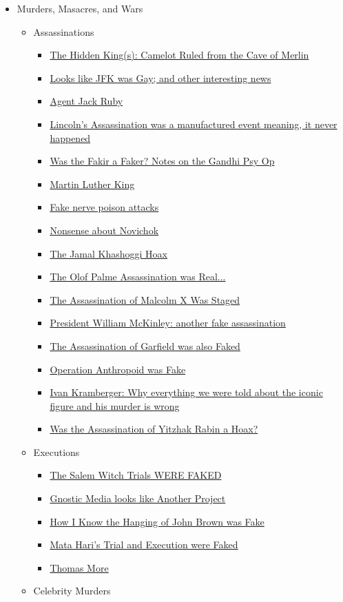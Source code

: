 \documentclass{article}
\newcommand{\insertmydocument}[2]{ %
  \item \href{http://www.mileswmathis.com/#2}{#1}
}
\begin{document}
\begin{itemize}
  \item Murders, Masacres, and Wars
  \begin{itemize}
  
    \item Assassinations
    \begin{itemize}

      \insertmydocument{The Hidden King(s): Camelot Ruled from the Cave of Merlin}{barindex2.pdf}
      \insertmydocument{Looks like JFK was Gay; and other interesting news}{jfkgay.pdf}
      \insertmydocument{Agent Jack Ruby}{ruby.pdf}
      \insertmydocument{Lincoln's Assassination was a manufactured event meaning, it never happened}{lincoln.pdf}
      \insertmydocument{Was the Fakir a Faker? Notes on the Gandhi Psy Op}{fakir.pdf}
      \insertmydocument{Martin Luther King}{mlk.pdf}
      \insertmydocument{Fake nerve poison attacks}{nerve.pdf}
      \insertmydocument{Nonsense about Novichok}{novi.pdf}
      \insertmydocument{The Jamal Khashoggi Hoax}{khash.pdf}
      \insertmydocument{The Olof Palme Assassination was Real...}{palme.pdf}
      \insertmydocument{The Assassination of Malcolm X Was Staged}{malc.pdf}
      \insertmydocument{President William McKinley: another fake assassination}{mckin.pdf}
      \insertmydocument{The Assassination of Garfield was also Faked}{garf.pdf}
      \insertmydocument{Operation Anthropoid was Fake}{anthropoid.pdf}
      \insertmydocument{Ivan Kramberger: Why everything we were told about the iconic figure and his murder is wrong}{kram.pdf}
      \insertmydocument{Was the Assassination of Yitzhak Rabin a Hoax?}{rabin.pdf}
    \end{itemize}

    \item Executions
    \begin{itemize}

      \insertmydocument{The Salem Witch Trials WERE FAKED}{salem.pdf}
      \insertmydocument{Gnostic Media looks like Another Project}{irvin.pdf}
      \insertmydocument{How I Know the Hanging of John Brown was Fake}{jbrown.pdf}
      \insertmydocument{Mata Hari's Trial and Execution were Faked}{mata.pdf}
      \insertmydocument{Thomas More}{more.pdf}
    \end{itemize}

    \item Celebrity Murders
    \begin{itemize}


\end{itemize}
\end{itemize}
\end{itemize}
\end{document}
